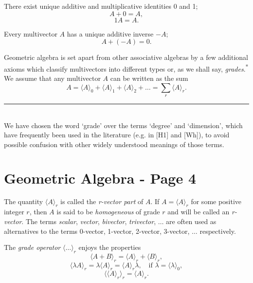 \documentclass[fleqn]{scrartcl}
\numberwithin{equation}{section}
\begin{document}
\noindent There exist unique additive and multiplicative identities 0 and 1;
\begin{equation}
A + 0 = A, \tag{1.6}
\end{equation}
\begin{equation}
1A = A. \tag{1.7}
\end{equation}

\noindent Every multivector \(A\) has a unique additive inverse \(-A\);
\begin{equation}
A + (-A) = 0. \tag{1.8}
\end{equation}

\vspace{1em}
\noindent Geometric algebra is set apart from other associative algebras by a few additional axioms which classify multivectors into different types or, as we shall say, \textit{grades}.\textsuperscript{*} We assume that any multivector \(A\) can be written as the sum
\begin{equation}
A = \langle A \rangle_0 + \langle A \rangle_1 + \langle A \rangle_2 + \dots = \sum_r \langle A \rangle_r. \tag{1.9}
\end{equation}

\vspace{2em}
\noindent \rule{5cm}{0.4pt} \\
\footnotesize \noindent * We have chosen the word `grade' over the terms `degree' and `dimension', which have frequently been used in the literature (e.g. in [H1] and [Wh]), to avoid possible confusion with other widely understood meanings of those terms.

\section*{Geometric Algebra - Page 4}

\noindent The quantity \(\langle A \rangle_r\) is called the \textit{r-vector part} of \(A\). If \(A = \langle A \rangle_r\) for some positive integer \(r\), then \(A\) is said to be \textit{homogeneous} of grade \(r\) and will be called an \textit{r-vector}. The terms \textit{scalar}, \textit{vector}, \textit{bivector}, \textit{trivector}, \(\dots\) are often used as alternatives to the terms 0-vector, 1-vector, 2-vector, 3-vector, \(\dots\) respectively.

\vspace{1em}
\noindent The \textit{grade operator} \(\langle \dots \rangle_r\) enjoys the properties
\begin{equation}
\langle A + B \rangle_r = \langle A \rangle_r + \langle B \rangle_r, \tag{1.10}
\end{equation}
\begin{equation}
\langle \lambda A \rangle_r = \lambda \langle A \rangle_r = \langle A \rangle_r \lambda, \quad \text{if } \lambda = \langle \lambda \rangle_0, \tag{1.11}
\end{equation}
\begin{equation}
\langle \langle A \rangle_r \rangle_r = \langle A \rangle_r. \tag{1.12}
\end{equation}
\end{document}
